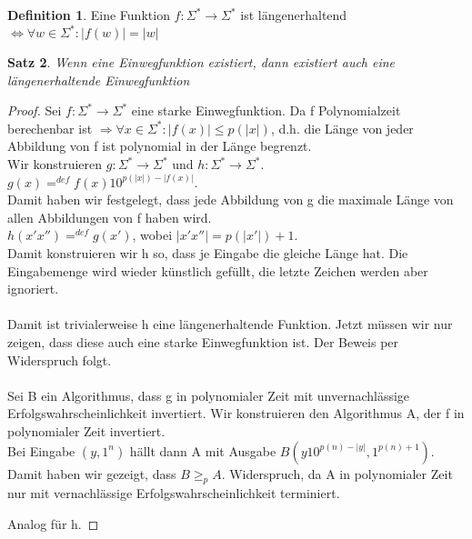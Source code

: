 \documentclass[12pt,a4paper]{article}
\newtheorem{theorem}{Satz}[section]
\theoremstyle{definition}
\newtheorem{definition}[theorem]{Definition}
\begin{document}
    \begin{definition}
        Eine Funktion $f: \Sigma^* \longrightarrow \Sigma^*$ ist
        längenerhaltend $\Leftrightarrow \forall w \in \Sigma^{*}: |f(w)| = |w|$
    \end{definition}
    \begin{theorem}
        Wenn eine Einwegfunktion existiert, dann existiert auch eine längenerhaltende Einwegfunktion
    \end{theorem}
    \begin{proof}
        Sei $f: \Sigma^* \longrightarrow \Sigma^*$ eine starke Einwegfunktion.
        Da f Polynomialzeit berechenbar ist $\Rightarrow \forall x \in \Sigma^*: |f(x)| \leq p(|x|)$, d.h. die
        Länge von jeder Abbildung von f ist polynomial in der Länge begrenzt. \\
        Wir konstruieren $g: \Sigma^* \longrightarrow \Sigma^*$ und $h: \Sigma^* \longrightarrow \Sigma^*$. \\
        $g(x) =^{def} f(x)10^{p(|x|) - |f(x)|}$. \\
        Damit haben wir festgelegt, dass jede Abbildung von g die maximale
        Länge von allen Abbildungen von f haben wird. \\
        $h(x'x'') =^{def} g(x')$, wobei $|x'x''| = p(|x'|) + 1$. \\
        Damit konstruieren wir h so, dass je Eingabe die gleiche
        Länge hat. Die Eingabemenge wird wieder künstlich gefüllt, die letzte Zeichen werden aber ignoriert. \\ \\
%
        Damit ist trivialerweise h eine längenerhaltende Funktion. Jetzt müssen wir nur zeigen, dass diese auch
        eine starke Einwegfunktion ist. Der Beweis per Widerspruch folgt.\\ \\
        Sei B ein Algorithmus, dass g in polynomialer Zeit mit unvernachlässige Erfolgswahrscheinlichkeit invertiert.
        Wir konstruieren den Algorithmus A, der f in polynomialer Zeit invertiert. \\
        Bei Eingabe $(y, 1^n)$ hällt dann A mit Ausgabe $B(y10^{p(n) - |y|}, 1^{p(n) + 1})$. \\
        Damit haben wir gezeigt, dass $B \geq_p A$. Widerspruch, da A in polynomialer Zeit nur mit vernachlässige
        Erfolgswahrscheinlichkeit terminiert.

        Analog für h.
    \end{proof}
\end{document}
